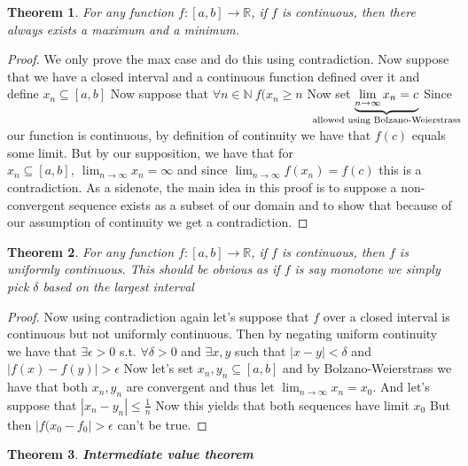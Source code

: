 \documentclass[titlepage]{article}
\newtheorem{theorem}{Theorem}[section]
\begin{document}
\begin{tcolorbox}[drop shadow, title = (Consequences of Bolzano-Weierstrass),lower separated=true]
\begin{theorem}
For any function $f: [a,b] \to \mathbb{R}$, if $f$ is continuous, then there always exists a maximum and a minimum.
\end{theorem}

\begin{proof}
We only prove the max case and do this using contradiction. Now suppose that we have a closed interval and a continuous function defined over it and define $x_{n} \subseteq [a,b]$ Now suppose that $\forall n \in \mathbb{N} \ f(x_{n} \geq n$ Now set $\underbrace{\lim_{n \to \infty}x_{n} = c}_{\text{\makebox[0pt]{allowed using Bolzano-Weierstrass}}} $ Since our function is continuous, by definition of continuity we have that $f(c)$ equals some limit. But by our supposition, we have that for $x_{n} \subseteq [a,b], \ \lim_{n\to \infty}x_{n} = \infty$ and since $\lim_{n \to \infty}f(x_{n}) = f(c)$ this is a contradiction.  As a sidenote, the main idea in this proof is to suppose a non-convergent sequence exists as a subset of our domain and to show that because of our assumption of continuity we get a contradiction.
\end{proof}


\begin{theorem}
For any function $f: [a,b] \to \mathbb{R}$, if $f$ is continuous, then $f$ is uniformly continuous. \textit{This should be obvious as if $f$ is say monotone we simply pick $\delta$ based on the largest interval}
\end{theorem}

\begin{proof}Now using contradiction again let's suppose that $f$ over a closed interval is continuous but not uniformly continuous. Then by negating uniform continuity we have that $\exists \epsilon > 0$ s.t. $\forall \delta > 0$ and $\exists x,y$ such that $|x-y|<\delta$ and $|f(x) - f(y)| > \epsilon$ Now let's set $x_{n},y_{n} \subseteq [a,b]$ and by Bolzano-Weierstrass we have that both $x_{n},y_{n}$ are convergent and thus let $\lim_{n \to \infty}x_{n} = x_{0}$. And let's suppose that $|x_{n} - y_{n}|\leq \frac{1}{n}$ Now this yields that both sequences have limit $x_{0}$ But then $|f(x_{0} - f_{0}| > \epsilon$ can't be true. 
\end{proof}

\begin{theorem}\textbf{Intermediate value theorem}
\\


\end{theorem}
\end{tcolorbox}
\end{document}
